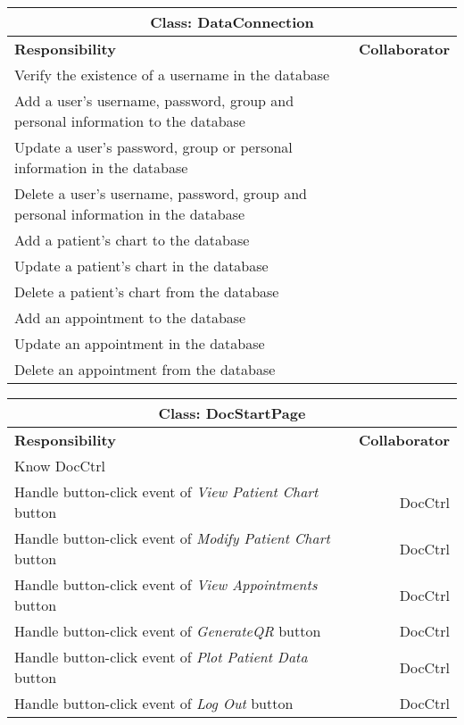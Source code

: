 \documentclass[12pt]{article}
\begin{document}
\begin{center}
\begin{tabularx}{\textwidth}{|X|r|} \hline
\multicolumn{2}{|c|}{\textbf{Class: DataConnection}}\\ \hline
\textbf{Responsibility} & \textbf{Collaborator} \\ \hline
Verify the existence of a username in the database & \\ \hline
Add a user's username, password, group and personal information to the database  & \\ \hline
Update a user's password, group or personal information in the database  & \\ \hline
Delete a user's username, password, group and personal information in the database  & \\ \hline
Add a patient's chart to the database  & \\ \hline
Update a patient's chart in the database  & \\ \hline
Delete a patient's chart from the database  & \\ \hline
Add an appointment to the database  & \\ \hline
Update an appointment in the database  & \\ \hline
Delete an appointment from the database  & \\ \hline
\end{tabularx}
\newline\newline
\end{center}

\begin{center}
\begin{tabularx}{\textwidth}{|X|r|} \hline
\multicolumn{2}{|c|}{\textbf{Class: DocStartPage}}\\ \hline
\textbf{Responsibility} & \textbf{Collaborator} \\ \hline
Know DocCtrl & \\ \hline
Handle button-click event of \emph{View Patient Chart} button & DocCtrl \\ \hline
Handle button-click event of \emph{Modify Patient Chart} button & DocCtrl \\ \hline
Handle button-click event of \emph{View Appointments} button & DocCtrl \\ \hline
Handle button-click event of \emph{GenerateQR} button & DocCtrl \\ \hline
Handle button-click event of \emph{Plot Patient Data} button & DocCtrl \\ \hline
Handle button-click event of \emph{Log Out} button & DocCtrl \\ \hline
\end{tabularx}
\newline\newline
\end{center}
\end{document}
